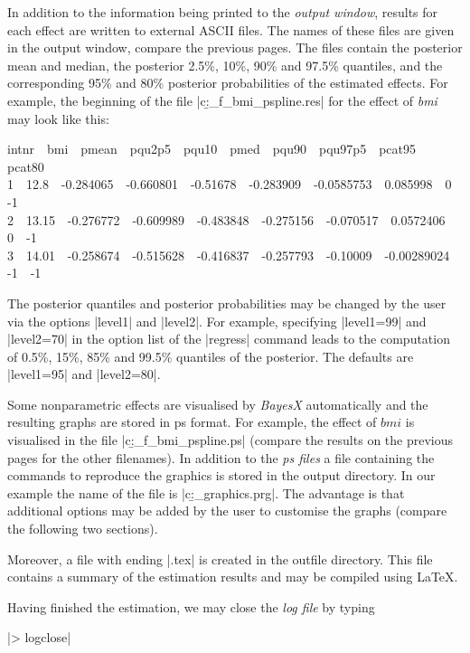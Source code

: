 In addition to the information being printed to the {\it output window}, results for each effect are written to external ASCII
files. The names of these files are given in the output window, compare the previous pages. The files contain the posterior
mean and median, the posterior 2.5\%, 10\%, 90\% and 97.5\% quantiles, and the corresponding 95\% and 80\% posterior
probabilities of the estimated effects. For example, the beginning of the file |c:\data\b_f_bmi_pspline.res| for the effect of
{\it bmi} may look like this:

{\footnotesize
 intnr \,\, bmi \,\, pmean \,\, pqu2p5 \,\, pqu10 \,\, pmed \,\, pqu90 \,\, pqu97p5 \,\, pcat95 \,\, pcat80\\
 1 \,\, 12.8 \,\, -0.284065 \,\, -0.660801 \,\, -0.51678 \,\, -0.283909 \,\, -0.0585753 \,\, 0.085998 \,\, 0 \,\, -1\\
 2 \,\, 13.15 \,\, -0.276772 \,\, -0.609989 \,\, -0.483848 \,\, -0.275156 \,\, -0.070517 \,\, 0.0572406 \,\, 0 \,\, -1\\
 3 \,\, 14.01 \,\, -0.258674 \,\, -0.515628 \,\, -0.416837 \,\, -0.257793 \,\, -0.10009 \,\, -0.00289024 \,\, -1 \,\, -1}

The posterior quantiles and posterior probabilities may be changed by the user via the options |level1| and |level2|. For
example, specifying |level1=99| and |level2=70| in the option list of the |regress| command leads to the computation of 0.5\%,
15\%, 85\% and 99.5\% quantiles of the posterior. The defaults are |level1=95| and |level2=80|.

Some nonparametric effects are visualised by {\it BayesX} automatically and the resulting graphs are stored in ps format. For
example, the effect of $\mathit{bmi}$ is visualised in the file |c:\data\b_f_bmi_pspline.ps| (compare the results on the
previous pages for the other filenames). In addition to the {\it ps files} a file containing the commands to reproduce the
graphics is stored in the output directory. In our example the name of the file is |c:\data\b_graphics.prg|. The advantage is
that additional options may be added by the user to customise the graphs (compare the following two sections).

Moreover, a file with ending |.tex| is created in the outfile directory. This file contains a summary of the estimation results
and may be compiled using \LaTeX.

Having finished the estimation, we may close the {\it log file} by typing

|> logclose|

